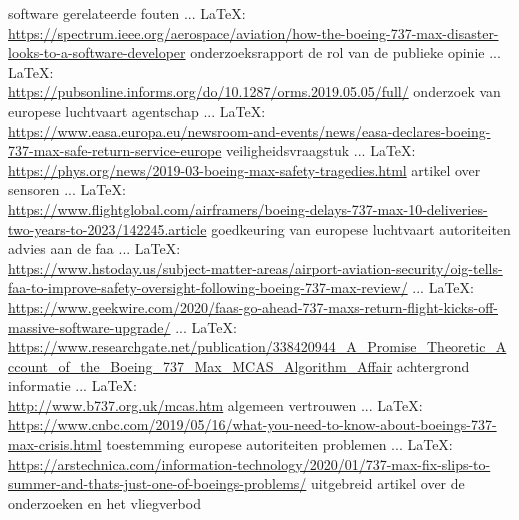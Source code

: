 \begin{thebibliography}{99}
{{{			software gerelateerde fouten
			 ... \LaTeX:\\ \url{https://spectrum.ieee.org/aerospace/aviation/how-the-boeing-737-max-disaster-looks-to-a-software-developer}
			onderzoeksrapport
			de rol van de publieke opinie
			 ... \LaTeX:\\ \url{https://pubsonline.informs.org/do/10.1287/orms.2019.05.05/full/}
			onderzoek van europese luchtvaart agentschap
			 ... \LaTeX:\\ \url{https://www.easa.europa.eu/newsroom-and-events/news/easa-declares-boeing-737-max-safe-return-service-europe}
			veiligheidsvraagstuk
			 ... \LaTeX:\\ \url{https://phys.org/news/2019-03-boeing-max-safety-tragedies.html}
			artikel over sensoren
			 ... \LaTeX:\\ \url{https://www.flightglobal.com/airframers/boeing-delays-737-max-10-deliveries-two-years-to-2023/142245.article}
			goedkeuring van europese luchtvaart autoriteiten
			advies aan de faa
			 ... \LaTeX:\\ \url{https://www.hstoday.us/subject-matter-areas/airport-aviation-security/oig-tells-faa-to-improve-safety-oversight-following-boeing-737-max-review/}
			 ... \LaTeX:\\ \url{https://www.geekwire.com/2020/faas-go-ahead-737-maxs-return-flight-kicks-off-massive-software-upgrade/}
			 ... \LaTeX:\\ \url{https://www.researchgate.net/publication/338420944_A_Promise_Theoretic_Account_of_the_Boeing_737_Max_MCAS_Algorithm_Affair}
			achtergrond informatie
			 ... \LaTeX:\\ \url{http://www.b737.org.uk/mcas.htm}
			algemeen vertrouwen
			 ... \LaTeX:\\ \url{https://www.cnbc.com/2019/05/16/what-you-need-to-know-about-boeings-737-max-crisis.html}
			toestemming europese autoriteiten
			problemen
			 ... \LaTeX:\\ \url{https://arstechnica.com/information-technology/2020/01/737-max-fix-slips-to-summer-and-thats-just-one-of-boeings-problems/}
			uitgebreid artikel over de onderzoeken en het vliegverbod
}}}
\end{thebibliography}
